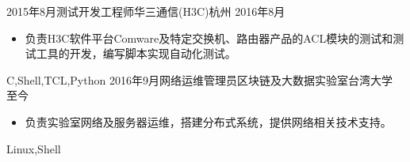  
\begin{experiences}		
	\experience
    {2015年8月}{测试开发工程师}{华三通信(H3C)}{杭州}
    {2016年8月}{
    	\begin{itemize}
    		\item
    		负责H3C软件平台Comware及特定交换机、路由器产品的ACL模块的测试和测试工具的开发，编写脚本实现自动化测试。
        \end{itemize}
               }
    {C,Shell,TCL,Python}
	\experience
    {2016年9月}{网络运维管理员}{区块链及大数据实验室}{台湾大学}
    {至今}{
    	\begin{itemize}
    		 \item
    		 负责实验室网络及服务器运维，搭建分布式系统，提供网络相关技术支持。                                                                                 
        \end{itemize}
          }
    {Linux,Shell}	
\end{experiences}
